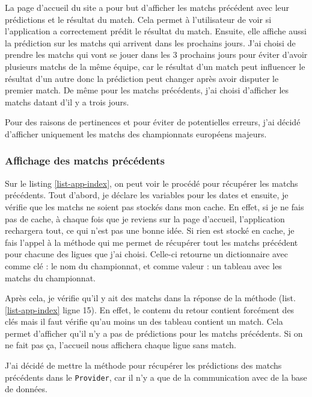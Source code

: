 \documentclass[a4paper,14pt]{extarticle}
\begin{document}
{La page d'accueil du site a pour but d'afficher les matchs précédent avec leur prédictions et le résultat du match. Cela permet à l'utilisateur de voir si l'application a correctement prédit le résultat du match. Ensuite, elle affiche aussi la prédiction sur les matchs qui arrivent dans les prochains jours. J'ai choisi de prendre les matchs qui vont se jouer dans les 3 prochains jours pour éviter d'avoir plusieurs matchs de la même équipe, car le résultat d'un match peut influencer le résultat d'un autre donc la prédiction peut changer après avoir disputer le premier match. De même pour les matchs précédents, j'ai choisi d'afficher les matchs datant d'il y a trois jours.

Pour des raisons de pertinences et pour éviter de potentielles erreurs, j'ai décidé d'afficher uniquement les matchs des championnats européens majeurs.

\subsubsection{Affichage des matchs précédents}

Sur le listing \ref{list-app-index}, on peut voir le procédé pour récupérer les matchs précédents. Tout d'abord, je déclare les variables pour les dates et ensuite, je vérifie que les matchs ne soient pas stockés dans mon cache. En effet, si je ne fais pas de cache, à chaque fois que je reviens sur la page d'accueil, l'application rechargera tout, ce qui n'est pas une bonne idée. Si rien est stocké en cache, je fais l'appel à la méthode qui me permet de récupérer tout les matchs précédent pour chacune des ligues que j'ai choisi. Celle-ci retourne un dictionnaire avec comme clé : le nom du championnat, et comme valeur : un tableau avec les matchs du championnat. 

Après cela, je vérifie qu'il y ait des matchs dans la réponse de la méthode (list. \ref{list-app-index} ligne 15). En effet, le contenu du retour contient forcément des clés mais il faut vérifie qu'au moins un des tableau contient un match. Cela permet d'afficher qu'il n'y a pas de prédictions pour les matchs précédents. Si on ne fait pas ça, l'accueil nous affichera chaque ligue sans match.


J'ai décidé de mettre la méthode pour récupérer les prédictions des matchs précédents dans le \texttt{Provider}, car il n'y a que de la communication avec de la base de données.

}
\end{document}
